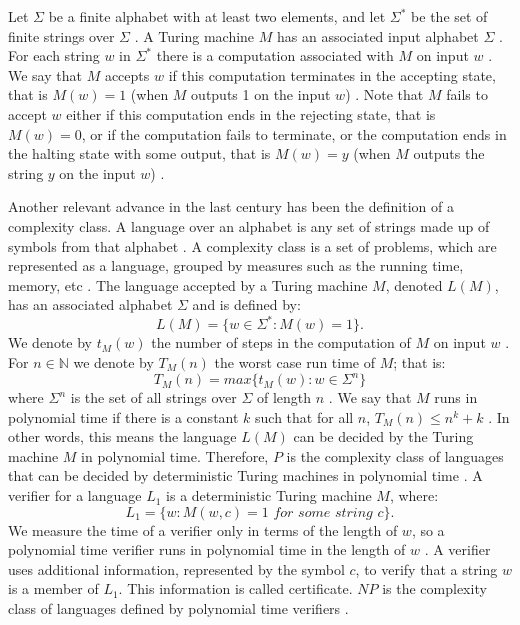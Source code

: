 \documentclass[a4paper,UKenglish,cleveref, autoref]{lipics-v2019}
\begin{document}
Let $\Sigma$ be a finite alphabet with at least two elements, and let $\Sigma^{*}$ be the set of finite strings over $\Sigma$ \cite{AB09}. A Turing machine $M$ has an associated input alphabet $\Sigma$ \cite{AB09}. For each string $w$ in $\Sigma^{*}$ there is a computation associated with $M$ on input $w$ \cite{AB09}. We say that $M$ accepts $w$ if this computation terminates in the accepting state, that is $M(w)=1$ (when $M$ outputs 1 on the input $w$) \cite{AB09}. Note that $M$ fails to accept $w$ either if this computation ends in the rejecting state, that is $M(w)=0$, or if the computation fails to terminate, or the computation ends in the halting state with some output, that is $M(w)=y$ (when $M$ outputs the string $y$ on the input $w$) \cite{AB09}.

Another relevant advance in the last century has been the definition of a complexity class. A language over an alphabet is any set of strings made up of symbols from that alphabet \cite{CLRS01}. A complexity class is a set of problems, which are represented as a language, grouped by measures such as the running time, memory, etc \cite{CLRS01}. The language accepted by a Turing machine $M$, denoted $L(M)$, has an associated alphabet $\Sigma$ and is defined by:
\[L(M) = \{w \in \Sigma^{*}: M(w)=1 \}.\]
We denote by $t_{M}(w)$ the number of steps in the computation of $M$ on input $w$ \cite{AB09}. For $n \in \mathbb{N}$ we denote by $T_{M}(n)$ the worst case run time of $M$; that is:
\[T_{M}(n) = max\{t_{M}(w): w \in \Sigma^{n} \}\]
where $\Sigma^{n}$ is the set of all strings over $\Sigma$ of length $n$ \cite{AB09}. We say that $M$ runs in polynomial time if there is a constant $k$ such that for all $n$, $T_{M}(n) \leq n^{k} + k$ \cite{AB09}. In other words, this means the language $L(M)$ can be decided by the Turing machine $M$ in polynomial time. Therefore, $P$ is the complexity class of languages that can be decided by deterministic Turing machines in polynomial time \cite{CLRS01}. A verifier for a language $L_{1}$ is a deterministic Turing machine $M$, where:
\[L_{1} = \{w: M(w, c) = 1 \textit{ for some string } c\}.\]
We measure the time of a verifier only in terms of the length of $w$, so a polynomial time verifier runs in polynomial time in the length of $w$ \cite{AB09}. A verifier uses additional information, represented by the symbol $c$, to verify that a string $w$ is a member of $L_{1}$. This information is called certificate. $NP$ is the complexity class of languages defined by polynomial time verifiers \cite{Pap03}.
\end{document}
